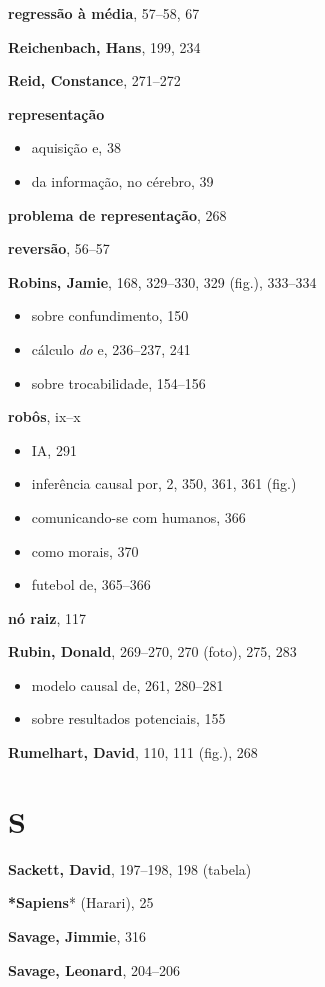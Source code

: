 \documentclass[11pt,a5paper,twoside]{book}
\begin{document}
\textbf{regressão à média}, 57–58, 67

\textbf{Reichenbach, Hans}, 199, 234

\textbf{Reid, Constance}, 271–272

\textbf{representação}

\begin{itemize}
\item aquisição e, 38
\item da informação, no cérebro, 39
\end{itemize}
\textbf{problema de representação}, 268

\textbf{reversão}, 56–57

\textbf{Robins, Jamie}, 168, 329–330, 329 (fig.), 333–334

\begin{itemize}
\item sobre confundimento, 150
\item cálculo \textit{do} e, 236–237, 241
\item sobre trocabilidade, 154–156
\end{itemize}
\textbf{robôs}, ix–x

\begin{itemize}
\item IA, 291
\item inferência causal por, 2, 350, 361, 361 (fig.)
\item comunicando-se com humanos, 366
\item como morais, 370
\item futebol de, 365–366
\end{itemize}
\textbf{nó raiz}, 117

\textbf{Rubin, Donald}, 269–270, 270 (foto), 275, 283

\begin{itemize}
\item modelo causal de, 261, 280–281
\item sobre resultados potenciais, 155
\end{itemize}
\textbf{Rumelhart, David}, 110, 111 (fig.), 268

\section{S}
\textbf{Sackett, David}, 197–198, 198 (tabela)

\textbf{*Sapiens}* (Harari), 25

\textbf{Savage, Jimmie}, 316

\textbf{Savage, Leonard}, 204–206
\end{document}
